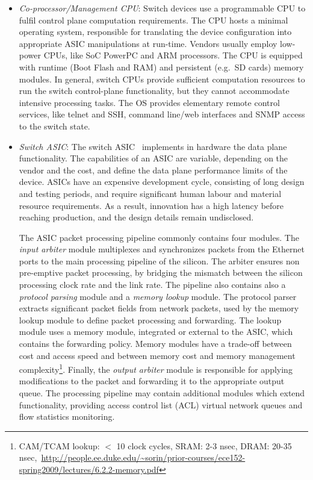 \begin{itemize}
  \item \emph{Co-processor/Management CPU}: Switch devices use a programmable
    CPU to fulfil control plane computation requirements. The CPU hosts a
    minimal operating system, responsible for translating the device configuration into
    appropriate ASIC manipulations at run-time. Vendors usually employ low-power CPUs, like SoC
    PowerPC and ARM processors. The CPU is equipped with runtime
    (Boot Flash and RAM) and persistent (e.g.~SD cards) memory modules. In general,
    switch CPUs provide sufficient computation resources to run the switch
    control-plane functionality, but they cannot accommodate intensive processing
    tasks. The OS provides elementary remote control services, like telnet and SSH,
    command line/web interfaces and SNMP access to the switch state. 
 
  \item \emph{Switch ASIC}: The switch ASIC~
    implements in hardware the data plane functionality. The capabilities of
    an ASIC are variable, depending on the vendor and the cost, and define the data
    plane performance limits of the device.  ASICs have an expensive
    development cycle, consisting of long design and
    testing periods, and require significant human labour and material resource
    requirements. As a result, innovation has a high latency before
    reaching production, and the design details remain undisclosed.  

    The ASIC packet processing pipeline commonly contains four modules.  The
    \emph{input arbiter} module multiplexes and synchronizes packets from the
    Ethernet ports to the main processing pipeline of the silicon. The arbiter
    ensures non pre-emptive packet processing, by bridging the mismatch
    between the silicon processing clock rate and the link rate. The pipeline also 
    contains also a \emph{protocol parsing} module and a
    \emph{memory lookup} module. The protocol parser extracts significant packet
    fields from network packets, used by the memory lookup module
    to define packet processing and forwarding.  The lookup module
    uses a memory module, integrated or external to the ASIC, which contains 
    the forwarding policy.  Memory modules have a trade-off
    between cost and access speed and between memory cost and memory management
    complexity\footnote{CAM/TCAM lookup: $<$ 10 clock cycles, SRAM: 2-3 nsec,
      DRAM: 20-35
      nsec,~\url{http://people.ee.duke.edu/~sorin/prior-courses/ece152-spring2009/lectures/6.2.2-memory.pdf}}.
    Finally, the \emph{output arbiter} module is responsible for applying modifications
    to the packet and forwarding it to the appropriate output queue.
    The processing pipeline may contain additional modules
    which extend functionality, providing
    access control list (ACL) virtual network queues and flow statistics
    monitoring.


\end{itemize}
